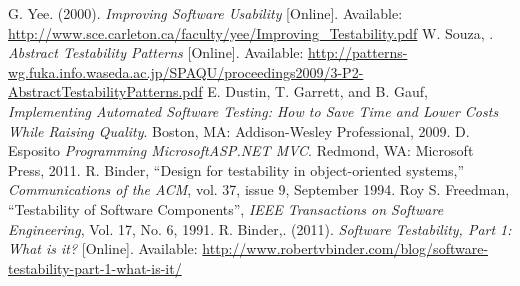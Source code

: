 \begin{thebibliography}{1}
%
G. Yee. (2000). \emph{Improving Software Usability} [Online]. Available: \url{http://www.sce.carleton.ca/faculty/yee/Improving_Testability.pdf}
%
W. Souza, . \emph{Abstract Testability Patterns} [Online]. Available: \url{http://patterns-wg.fuka.info.waseda.ac.jp/SPAQU/proceedings2009/3-P2-AbstractTestabilityPatterns.pdf}
%
E. Dustin, T. Garrett, and B. Gauf, \emph{Implementing Automated Software Testing: How to Save Time and Lower Costs While Raising Quality}. Boston, MA: Addison-Wesley Professional, 2009.
%
D. Esposito \emph{Programming Microsoft\textregistered \phantom{ }ASP.NET MVC}. Redmond, WA: Microsoft Press, 2011.
%
R. Binder, “Design for testability in object-oriented systems,” \emph{Communications of the ACM}, vol. 37, issue 9, September 1994.
%
Roy S. Freedman, “Testability of Software Components”,  \emph{IEEE 
Transactions on Software Engineering}, Vol. 17, No. 6, 1991.
%
R. Binder,. (2011). \emph{Software Testability, Part 1: What is it?} [Online]. Available: \url{http://www.robertvbinder.com/blog/software-testability-part-1-what-is-it/}
\end{thebibliography}
